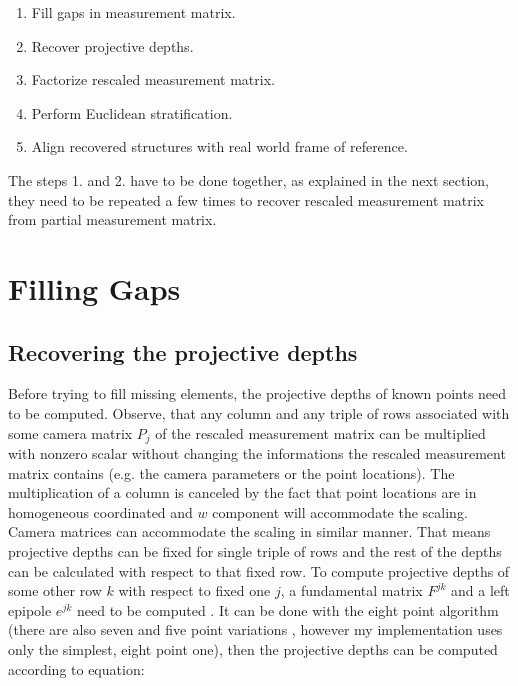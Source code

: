 \documentclass[12pt]{article}
\begin{document}
\begin{enumerate}
\item Fill gaps in measurement matrix.
\item Recover projective depths.
\item Factorize rescaled measurement matrix.
\item Perform Euclidean stratification.
\item Align recovered structures with real world frame of reference.
\end{enumerate}

The steps 1. and 2. have to be done together, as explained in the next section,
they need to be repeated a few times to recover rescaled measurement matrix from
partial measurement matrix.

\section{Filling Gaps}
\subsection{Recovering the projective depths}

Before trying to fill missing elements, the projective depths of known points
need to be computed. Observe, that any column and any triple of rows associated
with some camera matrix  $P_j$ of the rescaled measurement matrix can be
multiplied with nonzero scalar without  changing the informations the rescaled
measurement matrix contains (e.g. the camera parameters  or the point
locations). The multiplication of a column is canceled by the fact that point
locations are in homogeneous coordinated and $w$ component will accommodate the
scaling.  Camera matrices can accommodate the scaling in similar manner. That
means projective depths  can be fixed for single triple of rows and the rest of
the depths can be calculated with  respect to that fixed row. To compute
projective depths of some other row $k$ with respect to   fixed one $j$, a
fundamental matrix $F^{jk}$ and a left epipole $e^{jk}$ need to be computed
\cite{sturm96}. It can be done with the eight point algorithm \cite{hartley95}
(there are   also seven and five point variations \cite{stewenius06}, however
my implementation uses only    the simplest, eight point one), then the
projective depths can be computed according to equation:

\end{document}
